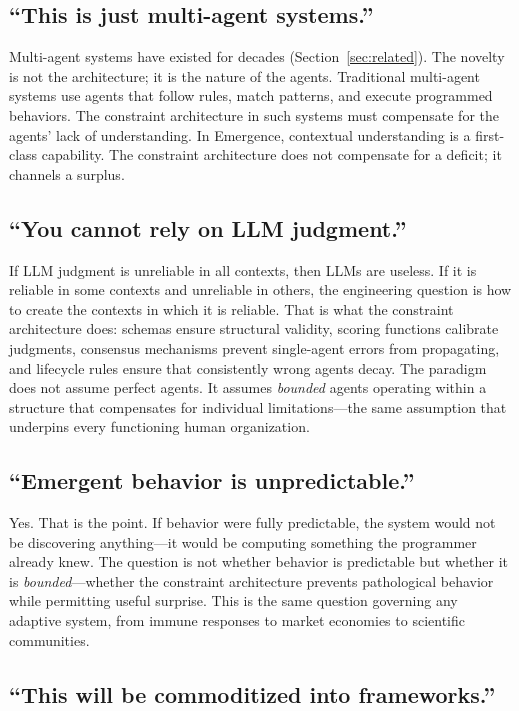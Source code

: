 \documentclass[11pt,twocolumn]{article}
\begin{document}
\subsection{``This is just multi-agent systems.''}

Multi-agent systems have existed for decades
(Section~\ref{sec:related}).  The novelty is not the architecture; it is
the nature of the agents.  Traditional multi-agent systems use agents
that follow rules, match patterns, and execute programmed behaviors.
The constraint architecture in such systems must compensate for the
agents' lack of understanding.  In Emergence, contextual understanding
is a first-class capability.  The constraint architecture does not
compensate for a deficit; it channels a surplus.

\subsection{``You cannot rely on LLM judgment.''}

If LLM judgment is unreliable in all contexts, then LLMs are useless.
If it is reliable in some contexts and unreliable in others, the
engineering question is how to create the contexts in which it is
reliable.  That is what the constraint architecture does: schemas ensure
structural validity, scoring functions calibrate judgments, consensus
mechanisms prevent single-agent errors from propagating, and lifecycle
rules ensure that consistently wrong agents decay.  The paradigm does
not assume perfect agents.  It assumes \emph{bounded} agents operating
within a structure that compensates for individual limitations---the
same assumption that underpins every functioning human organization.

\subsection{``Emergent behavior is unpredictable.''}

Yes.  That is the point.  If behavior were fully predictable, the system
would not be discovering anything---it would be computing something the
programmer already knew.  The question is not whether behavior is
predictable but whether it is \emph{bounded}---whether the constraint
architecture prevents pathological behavior while permitting useful
surprise.  This is the same question governing any adaptive system, from
immune responses to market economies to scientific communities.

\subsection{``This will be commoditized into frameworks.''}
\end{document}
